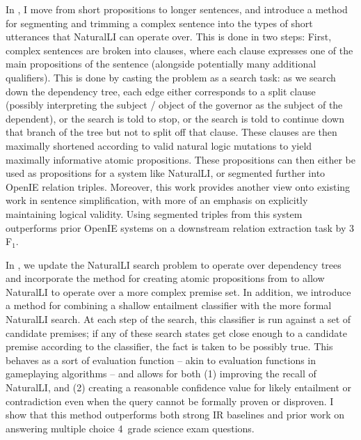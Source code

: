 In , I move from short propositions to longer sentences, and introduce a method for
  segmenting and trimming a complex sentence into the types of short utterances that NaturalLI can
  operate over.
This is done in two steps: First, complex sentences are broken into clauses, where each clause
  expresses one of the main propositions of the sentence (alongside potentially many additional
  qualifiers).
This is done by casting the problem as a search task: as we search down the dependency tree, each
  edge either corresponds to a split clause (possibly interpreting the subject / object of the
  governor as the subject of the dependent), or the search is told to stop, or the search is told
  to continue down that branch of the tree but not to split off that clause.
These clauses are then maximally shortened according to valid natural logic mutations to yield
  maximally informative atomic propositions.
These propositions can then either be used as propositions for a system like NaturalLI, or segmented
  further into OpenIE relation triples.
Moreover, this work provides another view onto existing work in sentence simplification, with more
  of an emphasis on explicitly maintaining logical validity.
Using segmented triples from this system outperforms prior OpenIE systems on a downstream relation
  extraction task by 3 F$_1$.

In , we update the NaturalLI search problem to operate over dependency trees and 
  incorporate the method for
  creating atomic propositions from  to allow NaturalLI to operate over a more complex
  premise set.
In addition, we introduce a method for combining a shallow entailment classifier with the more formal
  NaturalLI search.
At each step of the search, this classifier is run against a set of candidate premises; if any of these
  search states get close enough to a candidate premise according to the classifier, the fact is taken
  to be possibly true.
This behaves as a sort of evaluation function -- akin to evaluation functions in gameplaying algorithms --
  and allows for both (1) improving the recall of NaturalLI, and (2) creating a reasonable confidence
  value for likely entailment or contradiction even when the query cannot be formally proven or disproven.
I show that this method outperforms both strong IR baselines and prior work on answering multiple choice
  4\nth\ grade science exam questions.


